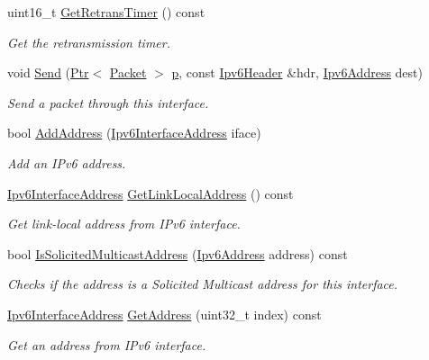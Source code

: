 \begin{DoxyCompactItemize}
uint16\+\_\+t \hyperlink{classns3_1_1Ipv6Interface_ac5c09de3e030331525b792a24559b92b}{Get\+Retrans\+Timer} () const 
\begin{DoxyCompactList}\small\item\em Get the retransmission timer. \end{DoxyCompactList}\item 
void \hyperlink{classns3_1_1Ipv6Interface_aa3be8d7a7f0d8232e2ec9e900a98f727}{Send} (\hyperlink{classns3_1_1Ptr}{Ptr}$<$ \hyperlink{classns3_1_1Packet}{Packet} $>$ \hyperlink{lte__link__budget__x2__handover__measures_8m_ac9de518908a968428863f829398a4e62}{p}, const \hyperlink{classns3_1_1Ipv6Header}{Ipv6\+Header} \&hdr, \hyperlink{classns3_1_1Ipv6Address}{Ipv6\+Address} dest)
\begin{DoxyCompactList}\small\item\em Send a packet through this interface. \end{DoxyCompactList}\item 
bool \hyperlink{classns3_1_1Ipv6Interface_a8faa5a72b30720eb01f9fc1d1113ad19}{Add\+Address} (\hyperlink{classns3_1_1Ipv6InterfaceAddress}{Ipv6\+Interface\+Address} iface)
\begin{DoxyCompactList}\small\item\em Add an I\+Pv6 address. \end{DoxyCompactList}\item 
\hyperlink{classns3_1_1Ipv6InterfaceAddress}{Ipv6\+Interface\+Address} \hyperlink{classns3_1_1Ipv6Interface_a6810fc180e1b4f4b1fb63ac12689eae2}{Get\+Link\+Local\+Address} () const 
\begin{DoxyCompactList}\small\item\em Get link-\/local address from I\+Pv6 interface. \end{DoxyCompactList}\item 
bool \hyperlink{classns3_1_1Ipv6Interface_afadcaf08cd39d5b429d6daa9b3bb0003}{Is\+Solicited\+Multicast\+Address} (\hyperlink{classns3_1_1Ipv6Address}{Ipv6\+Address} address) const 
\begin{DoxyCompactList}\small\item\em Checks if the address is a Solicited Multicast address for this interface. \end{DoxyCompactList}\item 
\hyperlink{classns3_1_1Ipv6InterfaceAddress}{Ipv6\+Interface\+Address} \hyperlink{classns3_1_1Ipv6Interface_ab76d19a817f0c9526a8bd8bde37561d7}{Get\+Address} (uint32\+\_\+t index) const 
\begin{DoxyCompactList}\small\item\em Get an address from I\+Pv6 interface. \end{DoxyCompactList}\item 

\end{DoxyCompactItemize}

